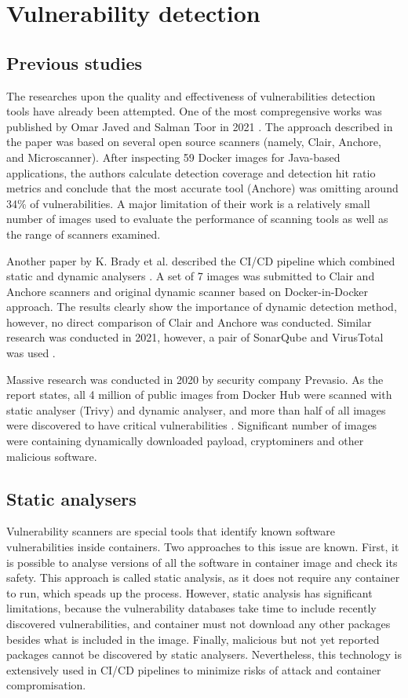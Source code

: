 \section{Vulnerability detection}

\subsection{Previous studies}

The researches upon the quality and effectiveness of vulnerabilities detection tools have already been attempted. One of the most compregensive works was published by Omar Javed and Salman Toor in 2021 \cite{arxiv:1}. The approach described in the paper was based on several open source scanners (namely, Clair, Anchore, and Microscanner). After inspecting 59 Docker images for Java-based applications, the authors calculate detection coverage and detection hit ratio metrics and conclude that the most accurate tool (Anchore) was omitting around 34\% of vulnerabilities. A major limitation of their work is a relatively small number of images used to evaluate the performance of scanning tools as well as the range of scanners examined.

Another paper by K. Brady et al. described the CI/CD pipeline which combined static and dynamic analysers \cite{c:2}. A set of 7 images was submitted to Clair and Anchore scanners and original dynamic scanner based on Docker-in-Docker approach. The results clearly show the importance of dynamic detection method, however, no direct comparison of Clair and Anchore was conducted. Similar research was conducted in 2021, however, a pair of SonarQube and VirusTotal was used \cite{c:3}.

Massive research was conducted in 2020 by security company Prevasio. As the report states, all 4 million of public images from Docker Hub were scanned with static analyser (Trivy) and dynamic analyser, and more than half of all images were discovered to have critical vulnerabilities \cite{report:dynamic}. Significant number of images were containing dynamically downloaded payload, cryptominers and other malicious software.

\subsection{Static analysers}

Vulnerability scanners are special tools that identify known software vulnerabilities inside containers. Two approaches to this issue are known. First, it is possible to analyse versions of all the software in container image and check its safety. This approach is called static analysis, as it does not require any container to run, which speads up the process. However, static analysis has significant limitations, because the vulnerability databases take time to include recently discovered vulnerabilities, and container must not download any other packages besides what is included in the image. Finally, malicious but not yet reported packages cannot be discovered by static analysers. Nevertheless, this technology is extensively used in CI/CD pipelines to minimize risks of attack and container compromisation.

